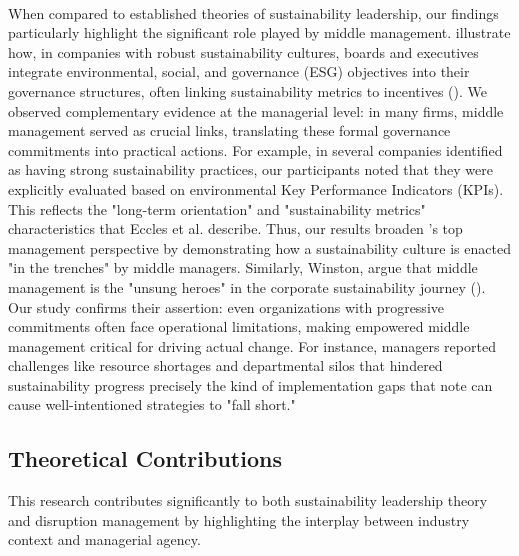 	\paragraph*{} When compared to established theories of sustainability leadership, our findings particularly highlight the significant role played by middle management. \citeauthor{Eccles2014} illustrate how, in companies with robust sustainability cultures, boards and executives integrate environmental, social, and governance (ESG) objectives into their governance structures, often linking sustainability metrics to incentives (\textcite{Eccles2014}). We observed complementary evidence at the managerial level: in many firms, middle management served as crucial links, translating these formal governance commitments into practical actions. For example, in several companies identified as having strong sustainability practices, our participants noted that they were explicitly evaluated based on environmental Key Performance Indicators (KPIs). This reflects the "long-term orientation" and "sustainability metrics" characteristics that Eccles et al. describe. Thus, our results broaden \citeauthor{Eccles2014}'s top management perspective by demonstrating how a sustainability culture is enacted "in the trenches" by middle managers. Similarly, Winston, \citeauthor{Winston2023} argue that middle management is the "unsung heroes" in the corporate sustainability journey (\textcite{Winston2023}). Our study confirms their assertion: even organizations with progressive commitments often face operational limitations, making empowered middle management critical for driving actual change. For instance, managers reported challenges like resource shortages and departmental silos that hindered sustainability progress precisely the kind of implementation gaps that \citeauthor{Winston2023} note can cause well-intentioned strategies to "fall short."
	
	\subsection{Theoretical Contributions}
	This research contributes significantly to both sustainability leadership theory and disruption management by highlighting the interplay between industry context and managerial agency.
	
